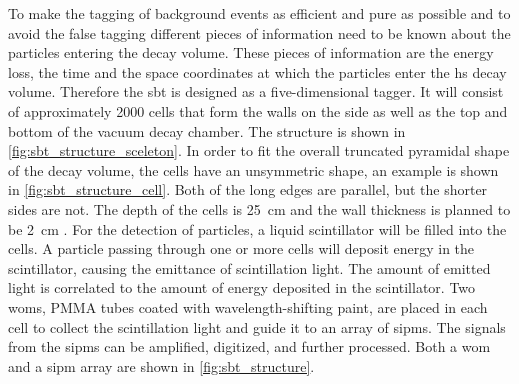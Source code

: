To make the tagging of background events as efficient and pure as possible and to avoid the false tagging different pieces of information need to be known about the particles entering the decay volume.
These pieces of information are the energy loss, the time and the space coordinates at which the particles enter the \ac{hs} decay volume.
Therefore the \ac{sbt} is designed as a five-dimensional tagger.
It will consist of approximately 2000 cells that form the walls on the side as well as the top and bottom of the vacuum decay chamber.
The structure is shown in \autoref{fig:sbt_structure_sceleton}.
In order to fit the overall truncated pyramidal shape of the decay volume, the cells have an unsymmetric shape, an example is shown in \autoref{fig:sbt_structure_cell}.
Both of the long edges are parallel, but the shorter sides are not.
The depth of the cells is \SI{25}{\centi\meter} and the wall thickness is planned to be \SI{2}{\centi\meter} \cite{}.
For the detection of particles, a liquid scintillator will be filled into the cells.
A particle passing through one or more cells will deposit energy in the scintillator, causing the emittance of scintillation light.
The amount of emitted light is correlated to the amount of energy deposited in the scintillator.
Two \acp{wom}, PMMA tubes coated with wavelength-shifting paint, are placed in each cell to collect the scintillation light and guide it to an array of \acp{sipm}.
The signals from the \acp{sipm} can be amplified, digitized, and further processed.
Both a \ac{wom} and a \ac{sipm} array are shown in \autoref{fig:sbt_structure}.
